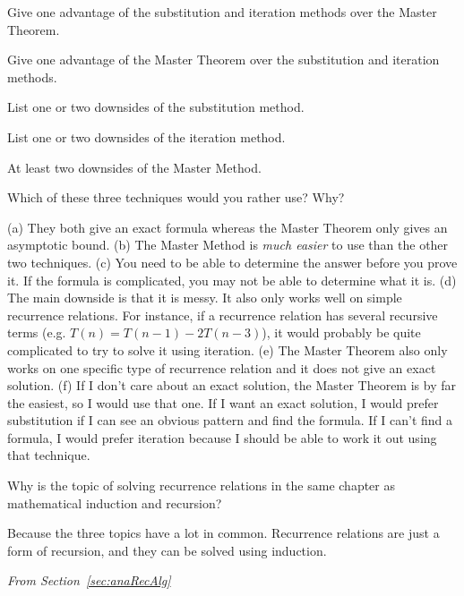 \begin{requ}
\begin{lenum}
\item Give one advantage of the substitution and iteration methods over the Master Theorem.
\item Give one advantage of the Master Theorem over the substitution and iteration methods.
\item List one or two downsides of the substitution method.
\item List one or two downsides of the iteration method.
\item At least two downsides of the Master Method.
\item Which of these three techniques would you rather use? Why?
\end{lenum}
\begin{requanswer}
(a) They both give an exact formula whereas the Master Theorem only gives an asymptotic bound.
(b) The Master Method is {\em much easier} to use than the other two techniques.
(c) You need to be able to determine the answer before you prove it. If the formula is complicated,
you may not be able to determine what it is.
(d) The main downside is that it is messy. It also only works well on simple recurrence relations. For instance,
if a recurrence relation has several recursive terms (e.g. $T(n)=T(n-1)-2T(n-3)$), it would probably be 
quite complicated to try to solve it using iteration.
(e) The Master Theorem also only works on one specific type of recurrence relation
and it does not give an exact solution.
(f) If I don't care about an exact solution, the Master Theorem is by far the easiest, so I would use that one.
If I want an exact solution, I would prefer substitution if I can see an obvious pattern and find the formula.
If I can't find a formula, I would prefer iteration because I should be able to work it out using that technique.
\end{requanswer}
\end{requ}

\begin{requ}
Why is the topic of solving recurrence relations in the same chapter as mathematical induction and recursion?
\begin{requanswer}
Because the three topics have a lot in common. Recurrence relations are just a form of recursion, and 
they can be solved using induction.
\end{requanswer}
\end{requ}

\noindent
{\em From Section~\ref{sec:anaRecAlg}}

